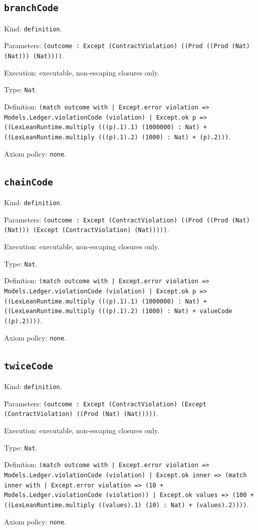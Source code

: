 \documentclass[11pt]{article}
\begin{document}
\subsection*{\texttt{branchCode}}
\noindent Kind: \texttt{definition}.\par
\noindent Parameters: \texttt{(outcome : Except (ContractViolation) ((Prod ((Prod (Nat) (Nat))) (Nat))))}.\par
\noindent Execution: executable, non-escaping closures only.\par
\noindent Type: \texttt{Nat}.\par
\noindent Definition: \texttt{(match outcome with | Except.error violation => Models.Ledger.violationCode (violation) | Except.ok p => ((LexLeanRuntime.multiply (((p).1).1) (1000000) : Nat) + ((LexLeanRuntime.multiply (((p).1).2) (1000) : Nat) + (p).2)))}.\par
\noindent Axiom policy: \texttt{none}.\par
\subsection*{\texttt{chainCode}}
\noindent Kind: \texttt{definition}.\par
\noindent Parameters: \texttt{(outcome : Except (ContractViolation) ((Prod ((Prod (Nat) (Nat))) (Except (ContractViolation) (Nat)))))}.\par
\noindent Execution: executable, non-escaping closures only.\par
\noindent Type: \texttt{Nat}.\par
\noindent Definition: \texttt{(match outcome with | Except.error violation => Models.Ledger.violationCode (violation) | Except.ok p => ((LexLeanRuntime.multiply (((p).1).1) (1000000) : Nat) + ((LexLeanRuntime.multiply (((p).1).2) (1000) : Nat) + valueCode ((p).2))))}.\par
\noindent Axiom policy: \texttt{none}.\par
\subsection*{\texttt{twiceCode}}
\noindent Kind: \texttt{definition}.\par
\noindent Parameters: \texttt{(outcome : Except (ContractViolation) (Except (ContractViolation) ((Prod (Nat) (Nat)))))}.\par
\noindent Execution: executable, non-escaping closures only.\par
\noindent Type: \texttt{Nat}.\par
\noindent Definition: \texttt{(match outcome with | Except.error violation => Models.Ledger.violationCode (violation) | Except.ok inner => (match inner with | Except.error violation => (10 + Models.Ledger.violationCode (violation)) | Except.ok values => (100 + ((LexLeanRuntime.multiply ((values).1) (10) : Nat) + (values).2))))}.\par
\noindent Axiom policy: \texttt{none}.\par
\end{document}
